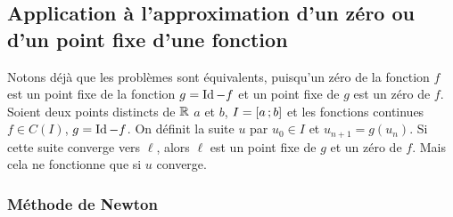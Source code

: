 \subsection{Application à l'approximation d'un zéro ou d'un point fixe d'une 
fonction}

Notons déjà que les problèmes sont équivalents, puisqu'un zéro de la fonction 
\(f\) est un point fixe de la fonction \(g=\operatorname{Id}-f\) et un point fixe de \(g\) est 
un zéro de \(f\). Soient deux points distincts de \(\mathbb{R}\) \(a\) et \(b\), 
\(I=\left[ a \, ; {} b \right]\) et les fonctions continues \(f \in \mathit{C}(I)\), 
\(g=\operatorname{Id} - f\). On définit la suite \(u\) par \(u_0 \in I\) et 
\(u_{n+1}=g(u_n)\). Si cette suite converge vers \(\ell\), alors \(\ell\) est un 
point fixe de \(g\) et un zéro de \(f\). Mais cela ne fonctionne que si \(u\) 
converge.

\subsubsection{Méthode de Newton}

